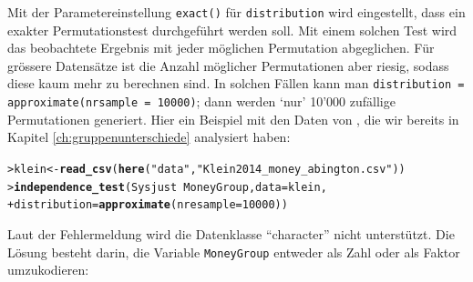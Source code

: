 \documentclass[oneside, 10pt]{book}\usepackage[]{graphicx}\usepackage[]{xcolor}
\makeatletter
\newcommand{\hlnum}[1]{\textcolor[rgb]{0.686,0.059,0.569}{#1}}%
\newcommand{\hlstr}[1]{\textcolor[rgb]{0.192,0.494,0.8}{#1}}%
\newcommand{\hlopt}[1]{\textcolor[rgb]{0,0,0}{#1}}%
\newcommand{\hlstd}[1]{\textcolor[rgb]{0.345,0.345,0.345}{#1}}%
\newcommand{\hlkwb}[1]{\textcolor[rgb]{0.69,0.353,0.396}{#1}}%
\newcommand{\hlkwc}[1]{\textcolor[rgb]{0.333,0.667,0.333}{#1}}%
\newcommand{\hlkwd}[1]{\textcolor[rgb]{0.737,0.353,0.396}{\textbf{#1}}}%
\newenvironment{kframe}{%
 \def\at@end@of@kframe{}%
 \ifinner\ifhmode%
  \def\at@end@of@kframe{\end{minipage}}%
  \begin{minipage}{\columnwidth}%
 \fi\fi%
 \def\FrameCommand##1{\hskip\@totalleftmargin \hskip-\fboxsep
 \colorbox{shadecolor}{##1}\hskip-\fboxsep
     \hskip-\linewidth \hskip-\@totalleftmargin \hskip\columnwidth}%
 \MakeFramed {\advance\hsize-\width
   \@totalleftmargin\z@ \linewidth\hsize
   \@setminipage}}%
 {\par\unskip\endMakeFramed%
 \at@end@of@kframe}
\newenvironment{knitrout}{}{} %
\makeatother
\begin{document}
Mit der Parametereinstellung \texttt{exact()} für \texttt{distribution}
wird eingestellt, dass ein exakter Permutationstest durchgeführt
werden soll. Mit einem solchen Test wird das beobachtete Ergebnis
mit jeder möglichen Permutation abgeglichen. Für grössere
Datensätze ist die Anzahl möglicher Permutationen aber riesig,
sodass diese kaum mehr zu berechnen sind. In solchen Fällen
kann man \texttt{distribution = approximate(nrsample = 10000)}; dann werden
`nur' 10'000 zufällige Permutationen generiert.
Hier ein Beispiel
mit den Daten von \citet{Klein2014}, die wir bereits in
Kapitel \ref{ch:gruppenunterschiede} analysiert haben:\label{page:kleinrandom}

\begin{knitrout}
\color{fgcolor}\begin{kframe}
\begin{alltt}
\hlstd{> }\hlstd{klein} \hlkwb{<-} \hlkwd{read_csv}\hlstd{(}\hlkwd{here}\hlstd{(}\hlstr{"data"}\hlstd{,} \hlstr{"Klein2014_money_abington.csv"}\hlstd{))}
\hlstd{> }\hlkwd{independence_test}\hlstd{(Sysjust} \hlopt{~} \hlstd{MoneyGroup,} \hlkwc{data} \hlstd{= klein,}
\hlstd{+ }                  \hlkwc{distribution} \hlstd{=} \hlkwd{approximate}\hlstd{(}\hlkwc{nresample} \hlstd{=} \hlnum{10000}\hlstd{))}
\end{alltt}


{\ttfamily\noindent\bfseries{}}\end{kframe}
\end{knitrout}
Laut der Fehlermeldung wird die Datenklasse ``character''
nicht unterstützt. Die Lösung besteht darin, die
Variable \texttt{MoneyGroup} entweder als Zahl oder als Faktor
umzukodieren:
\end{document}

